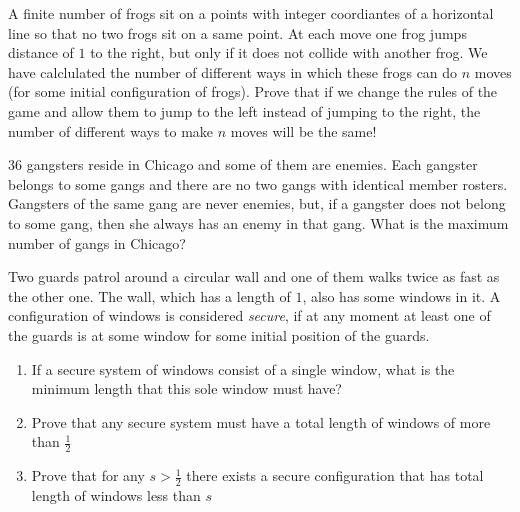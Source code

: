 

%



\renewcommand{\theenumi}{\alph{enumi}}



\noindent
 
\filbreak


\begin{problem}

A finite number of frogs sit on a points with integer coordiantes of a horizontal line so that no two frogs sit on a same point. At each move one frog jumps distance of $1$ to the right, but only if it does not collide with another frog. We have calclulated the number of different ways in which these frogs can do $n$ moves (for some initial configuration of frogs). Prove that if we change the rules of the game and allow them to jump to the left instead of jumping to the right, the number of different ways to make $n$ moves will be the same! 


\end{problem}

\begin{problem}

$36$ gangsters reside in Chicago and some of them are enemies. Each gangster belongs to some gangs and there are no two gangs with identical member rosters. Gangsters of the same gang are never enemies, but, if a gangster does not belong to some gang, then she always has an enemy in that gang. What is the maximum number of gangs in Chicago?


\end{problem}



\begin{problem}


Two guards patrol around a circular wall and one of them walks twice as fast as the other one. The wall, which has a length of $1$, also has some windows in it. A configuration of windows is considered \textit{secure}, if at any moment at least one of the guards is at some window for some initial position of the guards.
\begin {enumerate}
\item If a secure system of windows consist of a single window, what is the minimum length that this sole window must have?
\item Prove that any secure system must have a total length of windows of more than $\frac{1}{2}$
\item Prove that for any $s>\frac{1}{2}$ there exists a secure configuration that has total length of windows less than $s$
\end {enumerate}
\end{problem}




%

